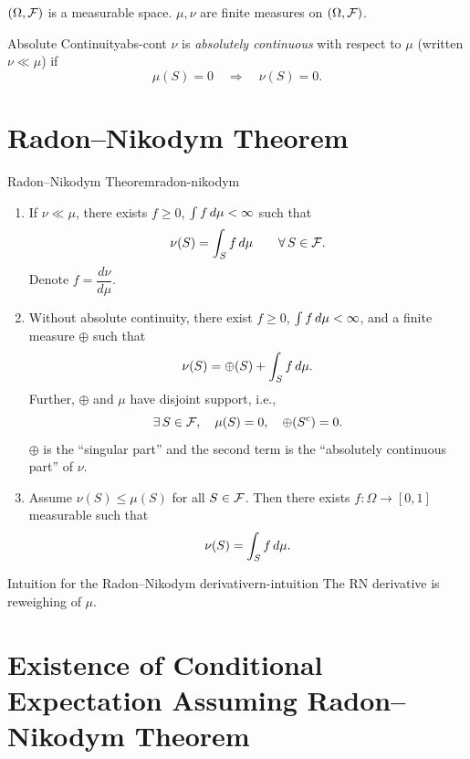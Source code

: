 $(\Omega, \mathcal{F})$ is a measurable space. $\mu, \nu$ are finite measures on $(\Omega, \mathcal{F})$.

\begin{definition}{Absolute Continuity}{abs-cont}
    $\nu$ is \emph{absolutely continuous} with respect to $\mu$ (written $\nu \ll \mu$) if
    \[
        \mu(S) = 0 \quad \Rightarrow \quad \nu(S) = 0.
    \]
\end{definition}

\section{Radon--Nikodym Theorem}

\begin{theorem}{Radon--Nikodym Theorem}{radon-nikodym}
    \begin{enumerate}[label=(\alph*)]
        \item If $\nu \ll \mu$, there exists $f \geq 0$, $\int f \,d\mu < \infty$ such that
        \[
            \nu(S) = \int_S f \,d\mu \qquad \forall\, S \in \mathcal{F}.
        \]
        Denote $f = \dfrac{d\nu}{d\mu}$.

        \item Without absolute continuity, there exist $f \geq 0$, $\int f \,d\mu < \infty$, and a finite measure $\oplus$ such that
        \[
            \nu(S) = \oplus(S) + \int_S f \,d\mu.
        \]
        Further, $\oplus$ and $\mu$ have disjoint support, i.e.,
        \[
            \exists\, S \in \mathcal{F}, \quad \mu(S) = 0, \quad \oplus(S^c) = 0.
        \]
        $\oplus$ is the ``singular part'' and the second term is the ``absolutely continuous part'' of $\nu$.

        \item Assume $\nu(S) \leq \mu(S)$ for all $S \in \mathcal{F}$. Then there exists $f : \Omega \to [0,1]$ measurable such that
        \[
            \nu(S) = \int_S f \,d\mu.
        \]
    \end{enumerate}
\end{theorem}

\begin{remark}{Intuition for the Radon--Nikodym derivative}{rn-intuition}
    The RN derivative is reweighing of $\mu$.
\end{remark}

\section{Existence of Conditional Expectation Assuming Radon--Nikodym Theorem}

